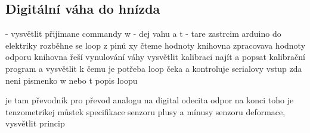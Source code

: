 
\subsection{Digitální váha do hnízda}\label{subsec:digitalni-vaha-do-hnizda}
- vysvětlit přijimane commandy w - dej vahu a t - tare
zastrcim arduino do elektriky
rozběhne se loop
z pinů xy čteme hodnoty
knihovna zpracovava hodnoty odporu
knihovna řeší vynulování váhy
vysvětlit kalibraci
najít a popsat kalibrační program a vysvětlit k čemu je potřeba
loop čeka a kontroluje serialovy vstup zda neni pismenko w nebo t
popis loopu

je tam převodník pro převod analogu na digital
odecita odpor
na konci toho je tenzometrikej můstek
specifikace senzoru
plusy a mínusy senzoru deformace, vysvětlit princip